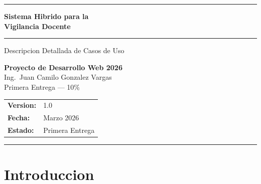 \documentclass[12pt, a4paper]{article}
\begin{document}
\thispagestyle{empty}

\begin{center}
  \vspace*{1.5cm}
  {\color{azulOscuro}\rule{\linewidth}{2.5pt}}
  \vspace{0.5cm}

  {\Huge\bfseries\color{azulOscuro} Sistema Hibrido para la\\[6pt] Vigilancia Docente}

  \vspace{0.4cm}
  {\color{azulMedio}\rule{\linewidth}{1pt}}
  \vspace{0.6cm}

  {\Large\color{azulMedio} Descripcion Detallada de Casos de Uso}

  \vspace{1.2cm}

  \begin{tcolorbox}[colback=azulClaro, colframe=azulMedio, arc=6pt,
    boxrule=1pt, left=16pt, right=16pt, top=12pt, bottom=12pt]
    \centering
    {\large\bfseries\color{azulOscuro} Proyecto de Desarrollo Web 2026}\\[6pt]
    {\normalsize\color{azulOscuro} Ing.\ Juan Camilo Gonzalez Vargas}\\[6pt]
    {\normalsize\color{azulOscuro} Primera Entrega --- 10\%}
  \end{tcolorbox}

  \vspace{1.5cm}

  {\normalsize\color{gray}
    \begin{tabular}{ll}
      \textbf{Version:} & 1.0 \\[2pt]
      \textbf{Fecha:}   & Marzo 2026 \\[2pt]
      \textbf{Estado:}  & Primera Entrega \\
    \end{tabular}
  }

  \vfill
  {\color{azulOscuro}\rule{\linewidth}{2.5pt}}
\end{center}

\newpage
\tableofcontents
\newpage

\section{Introduccion}
\end{document}
